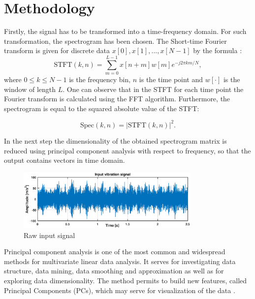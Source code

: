\documentclass[10pt]{article}
\begin{document}
\section{Methodology}
Firstly, the signal has to be transformed into a time-frequency domain. For such transformation, the spectrogram has been chosen. The Short-time Fourier transform is given for discrete data $x[0], x[1], ... , x[N-1]$ by the formula \cite{allen1977short}:
\begin{equation}
    \textrm{STFT}(k,n)=\sum_{m=0}^{L-1}x[n+m]w[m]e^{-j2\pi km/N},
\end{equation}
where $0\leq k \leq N-1$ is the frequency bin, $n$ is the time point and  $w[\cdot]$ is the window of length $L$. One can observe that in the STFT for each time point the Fourier transform is calculated using the FFT algorithm. Furthermore, the spectrogram is equal to the squared absolute value of the STFT:

\begin{equation}
\textrm{Spec}(k,n)=|\textrm{STFT}(k,n)|^2.
\end{equation}

In the next step the dimensionality of the obtained spectrogram matrix is reduced using principal component analysis with respect to frequency, so that the output contains vectors in time domain. 
\begin{figure}[ht!]
\centering
\includegraphics[width=0.8\textwidth]{wykresy/raw.eps}
\caption{Raw input signal}
\label{fig:raw}
\end{figure}
Principal component analysis is one of the most common and widespread methods for multivariate linear data analysis. It serves for investigating data structure, data mining, data smoothing and approximation as well as for exploring data dimensionality. The method permits to build new features, called Principal Components (PCs), which may serve for visualization of the data \cite{moore1981principal,wodecki2016combination,bartkowiak2014dimensionality,bartkowiak2012data}. 
\end{document}
